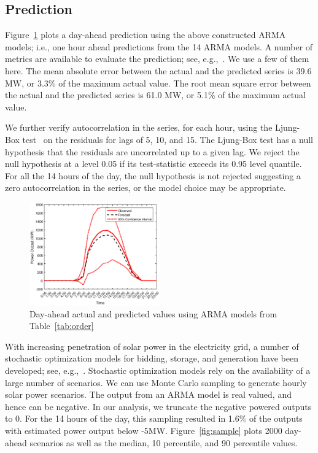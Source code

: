 \documentclass[11pt]{article} %
\begin{document}
\subsection{Prediction}

Figure~\ref{fig:prediction} plots a day-ahead prediction using the above 
constructed ARMA models; i.e., one hour ahead predictions from the 14 ARMA 
models. A number of metrics are available to evaluate the prediction; see, 
e.g.,~\cite{coimbra2013overview}. We use a few of them here. The mean absolute 
error between the actual 
and the predicted series is 
39.6 MW, or  3.3\% of the maximum actual value. The root mean square 
error between the actual and the predicted series is 
61.0 MW, or  5.1\% of the maximum actual value. 

We further verify autocorrelation in the series, for each hour, using the 
Ljung-Box test~\cite{ljung1978measure} on the residuals for lags of 5, 10, 
and 15. The Ljung-Box  test has a 
null hypothesis that the residuals are uncorrelated up to a 
given lag. We reject the null hypothesis at a level 0.05 if its test-statistic 
exceeds its 0.95 level quantile. For all the 14 hours of the day, the null hypothesis is not
rejected suggesting a zero autocorrelation in the series, or the 
model choice may be appropriate. 


\begin{figure}[!t]
\centering
\includegraphics[width=0.5\textwidth]{prediction.eps}
\caption{Day-ahead actual and predicted values using ARMA models from Table~\ref{tab:order}}
\label{fig:prediction}
\end{figure}

With increasing penetration of solar power in the electricity grid, a number of 
stochastic optimization models for bidding, storage, and generation have been 
developed; see, e.g.,~\cite{banos2011optimization}. 
Stochastic optimization models rely on the availability of a large number of 
scenarios.  We can use Monte Carlo sampling to generate hourly solar power 
scenarios. The output from an ARMA model is real valued, and hence can be 
negative. In our analysis, we truncate the negative powered outputs to 0. For 
the 14 hours of 
the day, this sampling resulted in 1.6\% of the outputs with estimated power 
output below -5MW. Figure~\ref{fig:sample} plots 2000 day-ahead scenarios 
as well as the median, 10 percentile, and 90 percentile values. 
\end{document}
